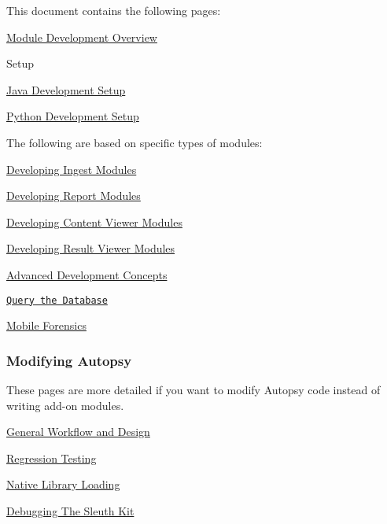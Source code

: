 This document contains the following pages\+:
\begin{DoxyItemize}
\item \hyperlink{platform_page}{Module Development Overview}
\item Setup
\begin{DoxyItemize}
\item \hyperlink{mod_dev_page}{Java Development Setup}
\item \hyperlink{mod_dev_py_page}{Python Development Setup}
\end{DoxyItemize}
\item The following are based on specific types of modules\+:
\begin{DoxyItemize}
\item \hyperlink{mod_ingest_page}{Developing Ingest Modules}
\item \hyperlink{mod_report_page}{Developing Report Modules}
\item \hyperlink{mod_content_page}{Developing Content Viewer Modules}
\item \hyperlink{mod_result_page}{Developing Result Viewer Modules}
\end{DoxyItemize}
\item \hyperlink{adv_dev_page}{Advanced Development Concepts}
\item \href{http://sleuthkit.org/sleuthkit/docs/jni-docs/4.3/query_database_page.html}{\tt Query the Database}
\item \hyperlink{mod_mobile_page}{Mobile Forensics}
\end{DoxyItemize}

\subsubsection*{Modifying Autopsy}

These pages are more detailed if you want to modify Autopsy code instead of writing add-\/on modules.
\begin{DoxyItemize}
\item \hyperlink{workflow_page}{General Workflow and Design}
\item \hyperlink{regression_test_page}{Regression Testing}
\item \hyperlink{native_page}{Native Library Loading}
\item \hyperlink{mod_debugTsk_page}{Debugging The Sleuth Kit} 
\end{DoxyItemize}